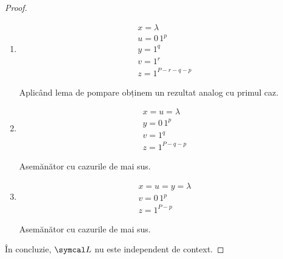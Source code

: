 \begin{proof}
\begin{enumerate}
        \item
              \begin{gather*}
                  x = \lambda \\
                  u = 0 \, 1^p \\
                  y = 1^q \\
                  v = 1^r \\
                  z = 1^{P - r - q - p}
              \end{gather*}

              Aplicând lema de pompare obținem un rezultat analog cu primul caz.

        \item
              \begin{gather*}
                  x = u = \lambda \\
                  y = 0 \, 1^p \\
                  v = 1^q \\
                  z = 1^{P - q - p}
              \end{gather*}

              Asemănător cu cazurile de mai sus.

        \item
              \begin{gather*}
                  x = u = y = \lambda \\
                  v = 0 \, 1^p \\
                  z = 1^{P - p}
              \end{gather*}

              Asemănător cu cazurile de mai sus.
    \end{enumerate}

    În concluzie, \(\limbaj\) nu este independent de context.
\end{proof}

